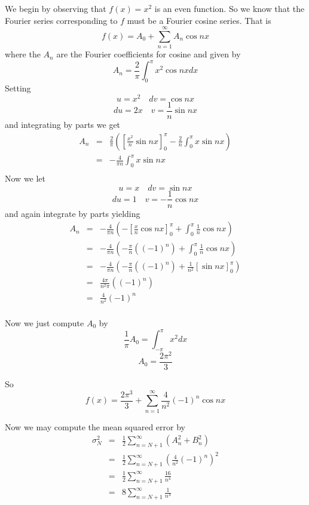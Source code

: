 \documentclass[12pt]{article}
\begin{document}
We begin by observing that $f(x) = x^2$ is an even function. So we know that the Fourier series corresponding to $f$ must be a Fourier cosine series. That is
\[f(x)=A_0+ \sum_{n=1}^\infty A_n \cos{n x}\]
where the $A_n$ are the Fourier coefficients for cosine and given by
\[A_n=\frac{2}{\pi}\int_{0}^\pi x^2 \cos{nx} dx\]
Setting
\[u=x^2 \quad dv = \cos{nx} \]
\[du=2x \quad v = \frac{1}{n} \sin{nx} \]
and integrating by parts we get
\begin{eqnarray*}
A_n &=& \frac{2}{\pi}\left( \left[ \frac{x^2}{n}\sin{nx}\right]_0^\pi  - \frac{2}{n} \int_{0}^\pi x \sin{nx} \right)\\
&=&    - \frac{4}{\pi n} \int_{0}^\pi x \sin{nx} \\
\end{eqnarray*}
Now we let
\[u=x \quad dv = \sin{nx} \]
\[du=1 \quad v = -\frac{1}{n} \cos{nx} \]
and again integrate by parts yielding
\begin{eqnarray*}
A_n &=&  - \frac{4}{\pi n} \left( - \left[\frac{x}{n}\cos{n x} \right]_0^\pi + \int_0^\pi \frac{1}{n} \cos{n x} \right)\\
 &=&  - \frac{4}{\pi n} \left( - \frac{\pi}{n} \left((-1)^n  \right) + \int_0^\pi \frac{1}{n} \cos{n x} \right)\\
 &=&  - \frac{4}{\pi n} \left( - \frac{\pi}{n} \left((-1)^n  \right) + \frac{1}{n^2} \left[  \sin{n x} \right]_0^\pi \right) \\
 &=&   \frac{4 \pi}{n^2 \pi} \left((-1)^n  \right)  \\
 &=&   \frac{4 }{n^2 } (-1)^n   \\
\end{eqnarray*}

Now we just compute $A_0$ by
\[\frac{1}{\pi}A_0=\int_{-\pi}^\pi x^2 dx \]
\[A_0=\frac{2 \pi ^2}{3}\]

So 
\[f(x)= \frac{2 \pi ^3}{3} + \sum_{n=1}^\infty  \frac{4 }{n^2 } (-1)^n  \cos{n x}\]

Now we may compute the mean squared error by \cite[Page 72]{pinsky}
\begin{eqnarray*}
\sigma^2_N &=& \frac{1}{2} \sum_{n=N+1}^\infty (A_n^2+B_n^2)\\
 &=& \frac{1}{2} \sum_{n=N+1}^\infty \left(\frac{4 }{n^2 } (-1)^n \right)^2\\
 &=& \frac{1}{2} \sum_{n=N+1}^\infty \frac{16 }{n^4 } \\
 &=& 8\sum_{n=N+1}^\infty \frac{1 }{n^4 } \\
\end{eqnarray*}
\end{document}
